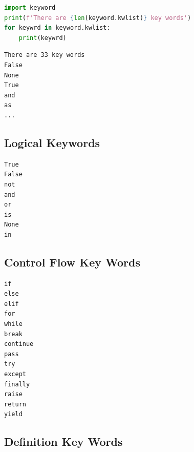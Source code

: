 \documentclass{book}
\newenvironment{key_terms}{\begin{multicols}{3}}{\end{multicols}} %
\begin{document}
    
        \begin{lstlisting}[language=Python]
import keyword
print(f'There are {len(keyword.kwlist)} key words')
for keywrd in keyword.kwlist:
    print(keywrd)
\end{lstlisting}

\begin{lstlisting}
There are 33 key words
False
None
True
and
as
...
\end{lstlisting}
    




    
        \subsection{Logical Keywords}\label{logical-keywords}
    




    
        \begin{key_terms}
        \begin{lstlisting}
True
False
not
and
or
is
None
in
\end{lstlisting}
        \end{key_terms}

    




    
        \subsection{Control Flow Key Words}\label{control-flow-key-words}
    




    
        \begin{key_terms}
        \begin{lstlisting}
if
else
elif
for
while
break
continue
pass
try
except
finally
raise
return
yield
\end{lstlisting}
        \end{key_terms}

    




    
        \subsection{Definition Key Words}\label{definition-key-words}
    
\end{document}
